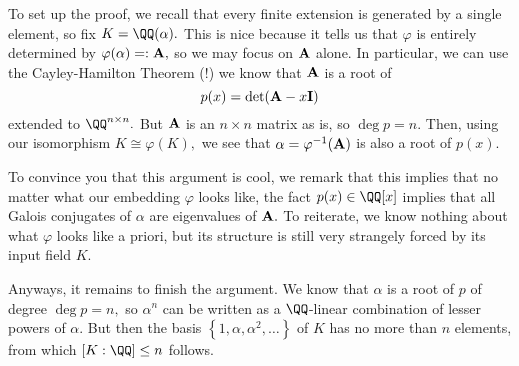 To set up the proof, we recall that every finite extension is generated by a single element, so fix $K=\QQ(\alpha).$ This is nice because it tells us that $\varphi$ is entirely determined by $\varphi(\alpha)=:\bf A,$ so we may focus on $\bf A$ alone. In particular, we can use the Cayley-Hamilton Theorem (!) we know that $\bf A$ is a root of
\[p(x)=\det({\bf A}-x{\bf I})\]
extended to $\QQ^{n\times n}.$ But $\bf A$ is an $n\times n$ matrix as is, so $\deg p=n.$ Then, using our isomorphism $K\cong\varphi(K),$ we see that $\alpha=\varphi^{-1}(\bf A)$ is also a root of $p(x).$

To convince you that this argument is cool, we remark that this implies that no matter what our embedding $\varphi$ looks like, the fact $p(x)\in\QQ[x]$ implies that all Galois conjugates of $\alpha$ are eigenvalues of $\bf A.$ To reiterate, we know nothing about what $\varphi$ looks like a priori, but its structure is still very strangely forced by its input field $K.$

Anyways, it remains to finish the argument. We know that $\alpha$ is a root of $p$ of degree $\deg p=n,$ so $\alpha^n$ can be written as a $\QQ$-linear combination of lesser powers of $\alpha.$ But then the basis $\left\{1,\alpha,\alpha^2,\ldots\right\}$ of $K$ has no more than $n$ elements, from which $[K:\QQ]\le n$ follows.

